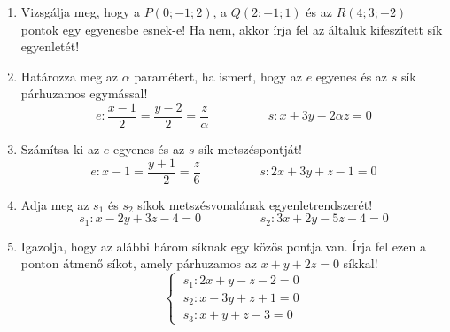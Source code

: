 \documentclass[a4paper, 12pt]{scrartcl}
\begin{document}
\begin{enumerate}
  \item Vizsgálja meg, hogy a $P(0;-1;2)$, a $Q(2;-1;1)$ és az $R(4;3;-2)$
        pontok egy egyenesbe esnek-e! Ha nem, akkor írja fel az általuk
        kifeszített sík egyenletét!

  \item Határozza meg az $\alpha$ paramétert, ha ismert, hogy az $e$ egyenes és
        az $s$ sík párhuzamos egymással!
        \[
          e: \frac{x - 1}{2} = \frac{y - 2}{2} = \frac{z}{\alpha}
          \hspace{2cm}
          s: x + 3y - 2\alpha z = 0
        \]

  \item Számítsa ki az $e$ egyenes és az $s$ sík metszéspontját!
        \[
          e: x - 1 = \frac{y + 1}{-2} = \frac{z}{6}
          \hspace{2cm}
          s: 2x + 3y + z - 1 = 0
        \]

  \item Adja meg az $s_1$ és $s_2$ síkok metszésvonalának egyenletrendszerét!
        \[
          s_1: x - 2y + 3z - 4 = 0
          \hspace{2cm}
          s_2: 3x + 2y - 5z - 4 = 0
        \]

  \item Igazolja, hogy az alábbi három síknak egy közös pontja van. Írja fel
        ezen a ponton átmenő síkot, amely párhuzamos az $x + y + 2z = 0$ síkkal!
        \[
          \begin{cases}
            \; s_1: 2x + y - z - 2 = 0 \\
            \; s_2: x - 3y + z + 1 = 0 \\
            \; s_3: x + y + z - 3 = 0
          \end{cases}
        \]
\end{enumerate}

\end{document}
